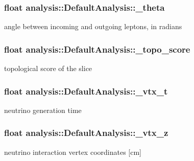 \subsubsection[{\texorpdfstring{\+\_\+theta}{_theta}}]{\setlength{\rightskip}{0pt plus 5cm}float analysis\+::\+Default\+Analysis\+::\+\_\+theta\hspace{0.3cm}{\ttfamily [private]}}\hypertarget{classanalysis_1_1DefaultAnalysis_adb169ccacccada1a17b6699a25f3fd67}{}\label{classanalysis_1_1DefaultAnalysis_adb169ccacccada1a17b6699a25f3fd67}
angle between incoming and outgoing leptons, in radians 
\subsubsection[{\texorpdfstring{\+\_\+topo\+\_\+score}{_topo_score}}]{\setlength{\rightskip}{0pt plus 5cm}float analysis\+::\+Default\+Analysis\+::\+\_\+topo\+\_\+score\hspace{0.3cm}{\ttfamily [private]}}\hypertarget{classanalysis_1_1DefaultAnalysis_a950efb6f4e8f1ad6dd00e24bc74002c2}{}\label{classanalysis_1_1DefaultAnalysis_a950efb6f4e8f1ad6dd00e24bc74002c2}
topological score of the slice 
\subsubsection[{\texorpdfstring{\+\_\+vtx\+\_\+t}{_vtx_t}}]{\setlength{\rightskip}{0pt plus 5cm}float analysis\+::\+Default\+Analysis\+::\+\_\+vtx\+\_\+t\hspace{0.3cm}{\ttfamily [private]}}\hypertarget{classanalysis_1_1DefaultAnalysis_a39b0367db015ffa41fc4663cb5aeb242}{}\label{classanalysis_1_1DefaultAnalysis_a39b0367db015ffa41fc4663cb5aeb242}
neutrino generation time 
\subsubsection[{\texorpdfstring{\+\_\+vtx\+\_\+z}{_vtx_z}}]{\setlength{\rightskip}{0pt plus 5cm}float analysis\+::\+Default\+Analysis\+::\+\_\+vtx\+\_\+z\hspace{0.3cm}{\ttfamily [private]}}\hypertarget{classanalysis_1_1DefaultAnalysis_afd279ca3ddc976b3d509e6c09c0c1514}{}\label{classanalysis_1_1DefaultAnalysis_afd279ca3ddc976b3d509e6c09c0c1514}
neutrino interaction vertex coordinates \mbox{[}cm\mbox{]} 
